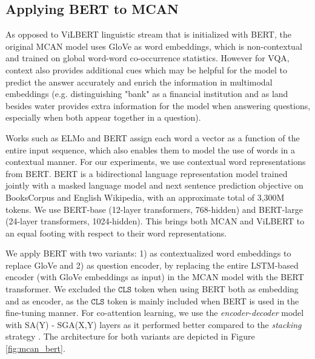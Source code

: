 \documentclass{article}
\begin{document}
\subsection{Applying BERT to MCAN}
As opposed to ViLBERT linguistic stream that is initialized with BERT, the original MCAN model uses GloVe as word embeddings, which is non-contextual and trained on global word-word co-occurrence statistics. However for VQA, context also provides additional cues which may be helpful for the model to predict the answer accurately and enrich the information in multimodal embeddings (e.g. distinguishing "bank" as a financial institution and as land besides water provides extra information for the model when answering questions, especially when both appear together in a question). 

Works such as ELMo \citep{peters2018elmo} and BERT \citep{devlin-etal-2019-bert} assign each word a vector as a function of the entire input sequence, which also enables them to model the use of words in a contextual manner. For our experiments, we use contextual word representations from BERT. BERT is a bidirectional language representation model trained jointly with a masked language model and next sentence prediction objective on BooksCorpus \citep{bookscorpus} and English Wikipedia, with an approximate total of 3,300M tokens. We use BERT-base (12-layer transformers, 768-hidden) and BERT-large (24-layer transformers, 1024-hidden). This brings both MCAN and ViLBERT to an equal footing with respect to their word representations.

We apply BERT with two variants: 1) as contextualized word embeddings to replace GloVe and 2) as question encoder, by replacing the entire LSTM-based encoder (with GloVe embeddings as input) in the MCAN model with the BERT transformer. We excluded the $\mathtt{CLS}$ token when using BERT both as embedding and as encoder, as the $\mathtt{CLS}$ token is mainly included when BERT is used in the fine-tuning manner. For co-attention learning, we use the \textit{encoder-decoder} model with SA(Y) - SGA(X,Y) layers as it performed better compared to the \textit{stacking} strategy \citep{yu2019mcan}. The architecture for both variants are depicted in Figure \ref{fig:mcan_bert}.
\end{document}
